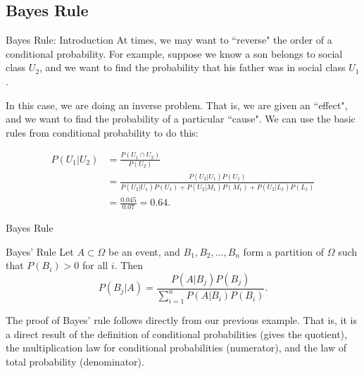 \subsection{Bayes Rule}

\begin{frame}[allowframebreaks]{Bayes Rule: Introduction}
  At times, we may want to ``reverse" the order of a conditional probability.
  For example, suppose we know a son belongs to social class $U_2$, and we want to find the probability that his father was in social class $U_1$.
  
  In this case, we are doing an \alert{inverse} problem.
  That is, we are given an ``effect", and we want to find the probability of a particular ``cause".
  We can use the basic rules from conditional probability to do this:
  
  \begin{align*}
    P(U_1 | U_2) &= \frac{P(U_1 \cap U_2)}{P(U_2)} \\
    &= \frac{P(U_2 | U_1)P(U_1)}{P(U_2 | U_1)P(U_1) + P(U_2 | M_1)P(M_1) + P(U_2|L_1)P(L_1)}\\
    &= \frac{0.045}{0.07} = 0.64.
  \end{align*}
  
\end{frame}

\begin{frame}{Bayes Rule}

  \begin{block}{Bayes' Rule}
    Let $A \subset \Omega$ be an event, and $B_1, B_2, \ldots, B_n$ form a partition of $\Omega$ such that $P(B_i) > 0$ for all $i$. Then
    $$
    P(B_j | A) = \frac{P(A | B_j)P(B_j)}{\sum_{i = 1}^n P(A|B_i)P(B_i)}.
    $$
  \end{block}
  
  The proof of Bayes' rule follows directly from our previous example. 
  That is, it is a direct result of the definition of conditional probabilities (gives the quotient), the multiplication law for conditional probabilities (numerator), and the law of total probability (denominator).
  
\end{frame}
  
